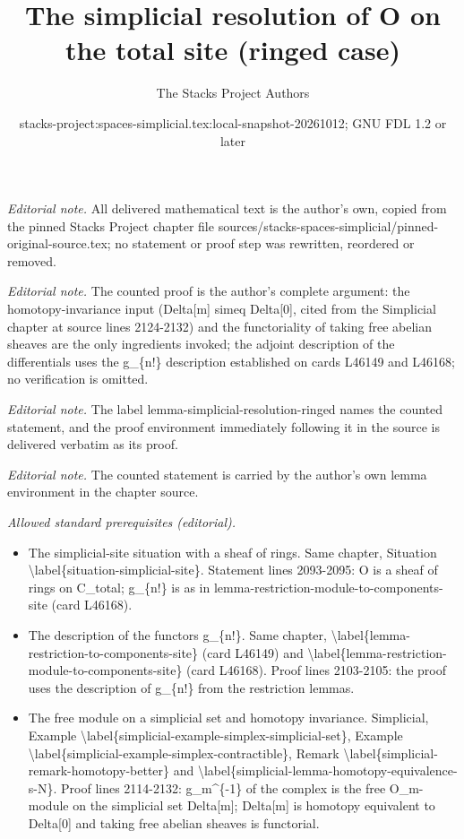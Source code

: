 \documentclass{stacks-project}
\title{The simplicial resolution of O on the total site (ringed case)}
\author{The Stacks Project Authors}
\date{stacks-project:spaces-simplicial.tex:local-snapshot-20261012; GNU FDL 1.2 or later}
\theoremstyle{plain}
\theoremstyle{definition}
\theoremstyle{remark}
\numberwithin{equation}{subsection}
\begin{document}
\maketitle
\noindent\textit{Editorial note.} All delivered mathematical text is the author's own, copied from the pinned Stacks Project chapter file sources/stacks-spaces-simplicial/pinned-original-source.tex; no statement or proof step was rewritten, reordered or removed.\par\medskip
\noindent\textit{Editorial note.} The counted proof is the author's complete argument: the homotopy-invariance input (Delta[m] simeq Delta[0], cited from the Simplicial chapter at source lines 2124-2132) and the functoriality of taking free abelian sheaves are the only ingredients invoked; the adjoint description of the differentials uses the g\_\{n!\} description established on cards L46149 and L46168; no verification is omitted.\par\medskip
\noindent\textit{Editorial note.} The label lemma-simplicial-resolution-ringed names the counted statement, and the proof environment immediately following it in the source is delivered verbatim as its proof.\par\medskip
\noindent\textit{Editorial note.} The counted statement is carried by the author's own lemma environment in the chapter source.\par\medskip
\noindent\textit{Allowed standard prerequisites (editorial).}\begin{itemize}
\item The simplicial-site situation with a sheaf of rings. Same chapter, Situation \textbackslash{}label\{situation-simplicial-site\}. Statement lines 2093-2095: O is a sheaf of rings on C\_total; g\_\{n!\} is as in lemma-restriction-module-to-components-site (card L46168).
\item The description of the functors g\_\{n!\}. Same chapter, \textbackslash{}label\{lemma-restriction-to-components-site\} (card L46149) and \textbackslash{}label\{lemma-restriction-module-to-components-site\} (card L46168). Proof lines 2103-2105: the proof uses the description of g\_\{n!\} from the restriction lemmas.
\item The free module on a simplicial set and homotopy invariance. Simplicial, Example \textbackslash{}label\{simplicial-example-simplex-simplicial-set\}, Example \textbackslash{}label\{simplicial-example-simplex-contractible\}, Remark \textbackslash{}label\{simplicial-remark-homotopy-better\} and \textbackslash{}label\{simplicial-lemma-homotopy-equivalence-s-N\}. Proof lines 2114-2132: g\_m\textasciicircum{}\{-1\} of the complex is the free O\_m-module on the simplicial set Delta[m]; Delta[m] is homotopy equivalent to Delta[0] and taking free abelian sheaves is functorial.
\end{itemize}\medskip
\end{document}
